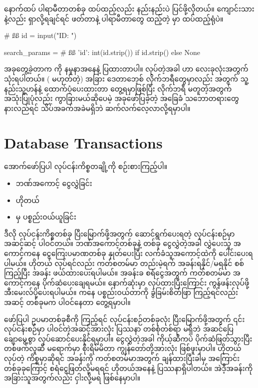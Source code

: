 %
နောက်ထပ် ပါရာမီတာတစ်ခု ထပ်ထည့်လည်း နည်းနည်းပဲ ပြင်ဖို့လိုတယ်။ ကျောင်းသား  နဲ့လည်း ရှာလို့ရချင်ရင်  ဖတ်တာနဲ့ ပါရာမီတာတွေ ထည့်တဲ့  မှာ ထပ်ထည့်ရုံပဲ။
%
\begin{py}
# ßß
id = input("ID: ")

search_params = {
    # ßß
    'id': int(id.strip()) if id.strip() else None
}
\end{py}
%

အခုတွေ့ခဲ့တာက  ကို နမူနာအနေနဲ့ ပြထားတာပါ။  လုပ်တဲ့အခါ  ဟာ  လေးခုလုံးအတွက် သုံးရပါတယ်။ ( မဟုတ်တဲ့) အခြား ဒေတာဘေ့စ် လိုက်ဘရီတွေမှာလည်း  အတွက် သူ့နည်းသူ့ဟန်နဲ့ ထောက်ပံ့ပေးထားတာ တွေ့ရမှာဖြစ်ပြီး လိုက်ဘရီ မတူတဲ့အတွက် အသုံးပြုပုံလည်း ကွာခြားမယ်ဆိုပေမဲ့  အခုဖော်ပြခဲ့တဲ့ အခြေခံ သဘောတရားတွေ နားလည်ရင် သိပ်အခက်အခဲမရှိဘဲ ဆက်လက်လေ့လာလို့ရမှာပါ။

\section{Database Transactions}
အောက်ဖော်ပြပါ လုပ်ငန်းကိစ္စတချို့ကို စဉ်းစားကြည့်ပါ။
%
\begin{itemize}
    \item ဘဏ်အကောင့် ငွေလွှဲခြင်း
    \item ဟိုတယ် 
    \item {} မှ ပစ္စည်းဝယ်ယူခြင်း
\end{itemize}
%
ဒီလို လုပ်ငန်းကိစ္စတစ်ခု ပြီးမြောက်ဖို့အတွက် ဆောင်ရွက်ပေးရတဲ့ လုပ်ငန်းစဉ်မှာ အဆင့်ဆင့် ပါဝင်တယ်။ ဘဏ်အကောင့်တစ်ခုနဲ့ တစ်ခု ငွေလွှဲတဲ့အခါ လွှဲပေးသူ အကောင့်ကနေ ငွေကြေးပမာဏတစ်ခု နှုတ်ပေးပြီး လက်ခံသူအကောင့်ထဲကို ပေါင်းပေးရပါမယ်။ ဟိုတယ်   လုပ်ရင်လည်း ကတ်စတမ်မာ တည်းမဲ့ရက် အခန်းရနိုင်/မရနိုင် စစ်ကြည့်ပြီး အခန်း ဖယ်ထားပေးရပါမယ်။ အခန်းခ စရံငွေအတွက် ကတ်စတမ်မာ အကောင့်ကနေ ပိုက်ဆံပေးချေရမယ်။ နောက်ဆုံးမှာ  လုပ်ထားပြီးကြောင်း ကွန်ဖန်းလုပ်ဖို့ အီးမေးလ်ပို့ပေးရပါမယ်။  ကနေ ပစ္စည်းဝယ်တာကို ခွဲခြမ်းစိတ်ဖြာ ကြည့်ရင်လည်း အဆင့် တစ်ခုမက ပါဝင်နေတာ တွေ့ရမှာပါ။

ဖော်ပြပါ ဥပမာတစ်ခုစီကို ကြည့်ရင် လုပ်ငန်းစဉ်တစ်ခုလုံး  ပြီးမြောက်ဖို့အတွက် ၎င်းလုပ်ငန်းစဉ်မှာ ပါဝင်တဲ့အဆင့်အားလုံး ပြဿနာ တစ်စုံ\allowbreak တစ်ရာ မရှိဘဲ အဆင်ပြေချောမွေ့စွာ လုပ်ဆောင်ပေးနိုင်ရမှာပါ။ ငွေလွှဲတဲ့အခါ ကိုယ့်ဆီကပဲ ပိုက်ဆံဖြတ်သွားပြီး တစ်ဖက်လူဆီ မရောက်မှာ စိုးရိမ်မိတာ ကျွန်တော်တို့အားလုံး ဖြစ်ဖူးမှာပါ။ ဟိုတယ်  လုပ်တဲ့ ကိစ္စမှာဆိုရင် အခန်းကို ကတ်စတမ်မာအတွက် ချန်ထားပြီးခါမှ အကြောင်းတစ်ခုခုကြောင့် စရံငွေဖြတ်လို့မရရင် ဟိုတယ်အနေနဲ့ ပြဿနာရှိပါတယ်။ အဲဒီ့အခန်းကို အခြားသူအတွက်လည်း ငှါးလို့မရ ဖြစ်နေမှာပါ။ 

